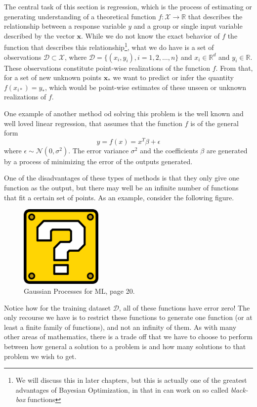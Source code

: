 The central task of this section is regression, which is the process of estimating or generating understanding of a theoretical function $f: \mathcal{X} \rightarrow \mathbb{R}$ that describes the relationship between a response variable $y$ and a group or single input variable described by the vector $\boldsymbol{x}$. While we do not know the exact behavior of $f$ the function that describes this relationship\footnote{We will discuss this in later chapters, but this is actually one of the greatest advantages of Bayesian Optimization, in that in can work on so called \textit{black-box} functions}, what we do have is a set of observations $\mathcal{D} \subset \mathcal{X}$, where $\mathcal{D} = \{ (x_i, y_i), i = 1,2,\ldots, n \}$ and $x_i \in \mathbb{R}^d$ and $y_i \in \mathbb{R}$. These observations constitute point-wise realizations of the function $f$. From that, for a set of new unknown points $\boldsymbol{x}_*$ we want to predict or infer the quantity $f(x_{i*}) = y_*$, which would be point-wise estimates of these unseen or unknown realizations of $f$. 

One example of another method od solving this problem is the well known and well loved linear regression, that assumes that the function $f$ is of the general form 
\[ y = f(x) = x^T \beta + \epsilon \]
where $\epsilon \sim \mathcal{N}(0, \sigma^2)$. The error variance $\sigma^2$ and the coefficients $\beta$ are generated by a process of minimizing the error of the outputs generated. 

One of the disadvantages of these types of methods is that they only give one function as the output, but there may well be an infinite number of functions that fit a certain set of points. As an example, consider the following figure. 

\begin{figure}[h]
	\includegraphics[width=4cm]{Figures/missing.png}
	\centering
	\caption{Gaussian Processes for ML, page 20.}
	\label{trajectories}
\end{figure}

Notice how for the training dataset $\mathcal{D}$, all of these functions have error zero! The only recourse we have is to restrict these functions to generate one function (or at least a finite family of functions), and not an infinity of them. As with many other areas of mathematics, there is a trade off that we have to choose to perform between how general a solution to a problem is and how many solutions to that problem we wish to get.

